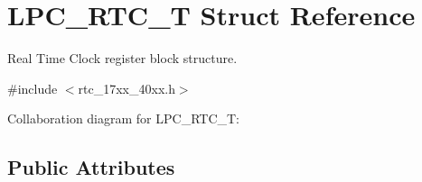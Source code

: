 \hypertarget{structLPC__RTC__T}{}\section{L\+P\+C\+\_\+\+R\+T\+C\+\_\+T Struct Reference}
\label{structLPC__RTC__T}


Real Time Clock register block structure.  




{\ttfamily \#include $<$rtc\+\_\+17xx\+\_\+40xx.\+h$>$}



Collaboration diagram for L\+P\+C\+\_\+\+R\+T\+C\+\_\+T\+:
\subsection*{Public Attributes}
